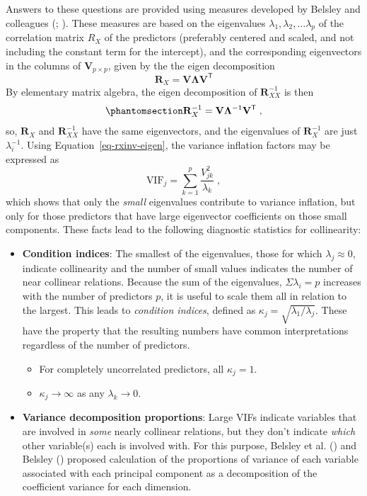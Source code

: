\documentclass[
  letterpaper,
  10pt,
  krantz2]{krantz}
\providecommand{\tightlist}{%
  \setlength{\itemsep}{0pt}\setlength{\parskip}{0pt}}\usepackage{longtable,booktabs,array}
\begin{document}
{Answers to these questions are provided using measures developed by
Belsley and colleagues (; ). These measures are
based on the eigenvalues \(\lambda_1, \lambda_2, \dots \lambda_p\) of
the correlation matrix \(R_{X}\) of the predictors (preferably centered
and scaled, and not including the constant term for the intercept), and
the corresponding eigenvectors in the columns of
\(\mathbf{V}_{p \times p}\), given by the the eigen decomposition \[
\mathbf{R}_{X} = \mathbf{V} \mathbf{\Lambda} \mathbf{V}^\textsf{T}
\] By elementary matrix algebra, the eigen decomposition of
\(\mathbf{R}_{XX}^{-1}\) is then
\begin{equation}\phantomsection\label{eq-rxinv-eigen}{
\mathbf{R}_{X}^{-1} = \mathbf{V} \mathbf{\Lambda}^{-1} \mathbf{V}^\textsf{T} \; ,
}\end{equation} so, \(\mathbf{R}_{X}\) and \(\mathbf{R}_{XX}^{-1}\) have
the same eigenvectors, and the eigenvalues of \(\mathbf{R}_{X}^{-1}\)
are just \(\lambda_i^{-1}\). Using Equation~\ref{eq-rxinv-eigen}, the
variance inflation factors may be expressed as \[
\text{VIF}_j = \sum_{k=1}^p \frac{V^2_{jk}}{\lambda_k} \; ,
\] which shows that only the \emph{small} eigenvalues contribute to
variance inflation, but only for those predictors that have large
eigenvector coefficients on those small components. These facts lead to
the following diagnostic statistics for collinearity:

\begin{itemize}
\item
  \textbf{Condition indices}: The smallest of the eigenvalues, those for
  which \(\lambda_j \approx 0\), indicate collinearity and the number of
  small values indicates the number of near collinear relations. Because
  the sum of the eigenvalues, \(\Sigma \lambda_i = p\) increases with
  the number of predictors \(p\), it is useful to scale them all in
  relation to the largest. This leads to \emph{condition indices},
  defined as \(\kappa_j = \sqrt{ \lambda_1 / \lambda_j}\). These have
  the property that the resulting numbers have common interpretations
  regardless of the number of predictors.

  \begin{itemize}
  \tightlist
  \item
    For completely uncorrelated predictors, all \(\kappa_j = 1\).
  \item
    \(\kappa_j \rightarrow \infty\) as any \(\lambda_k \rightarrow 0\).
  \end{itemize}
\item
  \textbf{Variance decomposition proportions}: Large VIFs indicate
  variables that are involved in \emph{some} nearly collinear relations,
  but they don't indicate \emph{which} other variable(s) each is
  involved with. For this purpose, Belsley et al.
  () and Belsley
  () proposed calculation of the
  proportions of variance of each variable associated with each
  principal component as a decomposition of the coefficient variance for
  each dimension.
\end{itemize}

}
\end{document}
